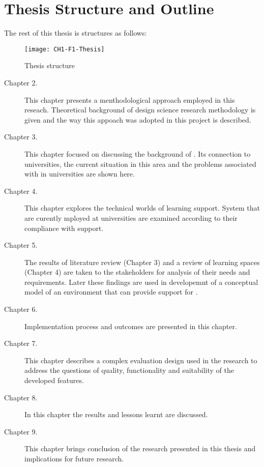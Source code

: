\section{Thesis Structure and Outline}

The rest of this thesis is structures as follows:

\begin{figure}[htb]
\centering
\texttt{[image: CH1-F1-Thesis]}
\caption{Thesis structure}
\label{fig:ts}
\end{figure}

\begin{description}
\item[Chapter 2.] This chapter presents a menthodological approach employed in
this reseach. Theoretical background of design science research methodology is
given and the way this appoach was adopted in this project is described.
\item[Chapter 3.] This chapter focused on discussing the background of \LLLsn.
Its connection to universities, the current situation in this area and the
problems associated with \LLLs in universities are shown here.
\item[Chapter 4.] This chapter explores the technical worlds of learning
support. System that are curently mployed at universities are examined according
to their compliance with \LLLs support.
\item[Chapter 5.] The results of literature review (Chapter 3) and a review of
learning spaces (Chapter 4) are taken to the stakeholders for analysis of their
needs and requirements. Later these findings are used in developemnt of a conceptual model
of an environment that can provide support for \LLLsn.
\item[Chapter 6.] Implementation process and outcomes are presented in this
chapter.
\item[Chapter 7.] This chapter describes a complex evaluation design used in the
research to address the questions of quality, functionality and suitability of
the developed features.
\item[Chapter 8.] In this chapter the results and lessons learnt are discussed.
\item[Chapter 9.] This chapter brings conclusion of the research presented in
this thesis and implications for future research.
\end{description}